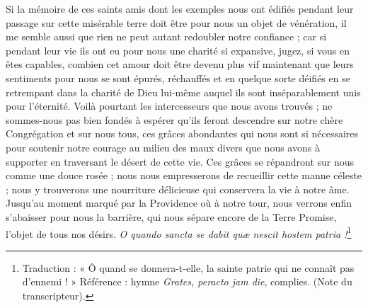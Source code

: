 Si la mémoire de ces saints amis dont les exemples nous ont édifiés pendant leur passage sur cette misérable terre doit être pour nous un objet de vénération, il me semble aussi que rien ne peut autant redoubler notre confiance ; car si pendant leur vie ils ont eu pour nous une charité si expansive, jugez, si vous en êtes capables, combien cet amour doit être devenu plus vif maintenant que leurs sentiments pour nous se sont épurés, réchauffés et en quelque sorte déifiés en se retrempant dans la
charité de Dieu lui-même auquel ils sont inséparablement unis pour l'éternité. Voilà pourtant les intercesseurs que nous avons trouvés ; ne sommes-nous pas bien fondés à espérer qu'ils feront descendre sur notre chère Congrégation et sur nous tous, ces grâces abondantes qui nous sont si nécessaires pour soutenir notre courage au milieu des maux divers que nous avons à supporter en traversant le désert de cette vie. Ces grâces se répandront sur nous comme une douce rosée ; nous nous empresserons de recueillir cette manne céleste ; nous y trouverons une nourriture délicieuse qui conservera la vie à notre âme. Jusqu'au moment marqué par la Providence où à notre tour, nous verrons enfin s'abaisser pour nous la barrière, qui nous sépare encore de la Terre Promise, l'objet de tous nos désirs. \textit{O quando sancta se dabit quæ nescit hostem patria !}\footnote{Traduction : « Ô quand se donnera-t-elle, la sainte patrie qui ne connaît pas d’ennemi ! » Référence : hymne \textit{Grates, peracto jam die}, complies. (Note du transcripteur).}


